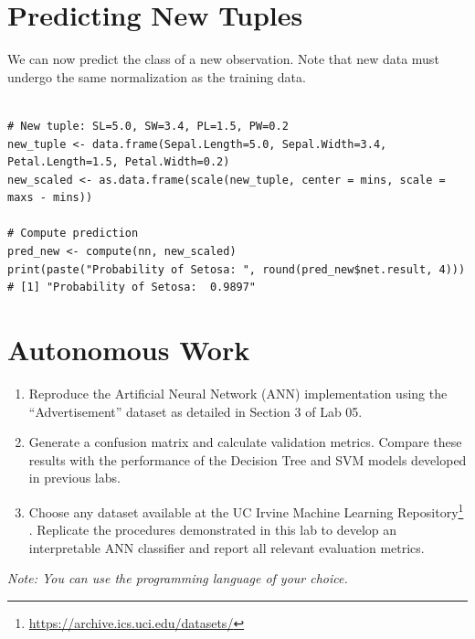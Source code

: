 \documentclass{article}
\begin{document}
\section{Predicting New Tuples}
We can now predict the class of a new observation. Note that new data must undergo the same normalization as the training data.

\begin{listing}[H]
    \begin{verbatim}

# New tuple: SL=5.0, SW=3.4, PL=1.5, PW=0.2
new_tuple <- data.frame(Sepal.Length=5.0, Sepal.Width=3.4, Petal.Length=1.5, Petal.Width=0.2)
new_scaled <- as.data.frame(scale(new_tuple, center = mins, scale = maxs - mins))

# Compute prediction
pred_new <- compute(nn, new_scaled)
print(paste("Probability of Setosa: ", round(pred_new$net.result, 4)))
# [1] "Probability of Setosa:  0.9897"

    \end{verbatim}
    \caption{Predictive inference for a new data observation. This final step scales a new data tuple and uses the trained network to compute the probability of it belonging to a specific class.}
\end{listing}

\section{Autonomous Work}

\begin{enumerate}

    \item Reproduce the Artificial Neural Network (ANN) implementation using the ``Advertisement'' dataset as detailed in Section 3 of Lab 05.

    \item Generate a confusion matrix and calculate validation metrics. Compare these results with the performance of the Decision Tree and SVM models developed in previous labs.

    \item Choose any dataset available at the UC Irvine Machine Learning Repository\footnote{\url{https://archive.ics.uci.edu/datasets/}} \parencite{Dua2019}. Replicate the procedures demonstrated in this lab to develop an interpretable ANN classifier and report all relevant evaluation metrics.

\end{enumerate}

\textit{Note: You can use the programming language of your choice.}

\printbibliography[title={References}]
\end{document}
